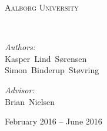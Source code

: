 \newcommand{\HRule}{\rule{\linewidth}{0.5mm}}
\begin{titlingpage}
  \begin{center}
    \vspace*{0.5cm}

    \textsc{\LARGE Aalborg University}\\[1.5cm]

    \vspace{2.5cm}

    {\HUGE \bfseries \productname{}}\\
    \vspace{0.2cm}
    {\small }

    \vspace{2.5cm}

    \begin{minipage}[t]{0.4\textwidth}
      \begin{flushleft} \large
        \emph{Authors:}\\
        Kasper~Lind~Sørensen\\
        Simon~Binderup~Støvring
      \end{flushleft}
    \end{minipage}
    \begin{minipage}[t]{0.4\textwidth}
      \begin{flushright} \large
        \emph{Advisor:} \\
        Brian~Nielsen
      \end{flushright}
    \end{minipage}

    \vfill

    {\large February 2016 -- June 2016}

  \end{center}
\end{titlingpage}
